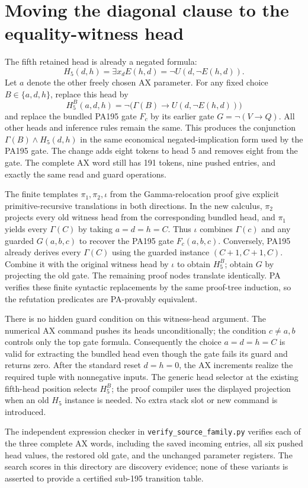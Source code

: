 \section{Moving the diagonal clause to the equality-witness head}
The fifth retained head is already a negated formula:
\[
 H_5(d,h)=\exists x_d E(h,d)=\neg U(d,\neg E(h,d)).
\]
Let $a$ denote the other freely chosen AX parameter.  For any fixed choice
$B\in\{a,d,h\}$, replace this head by
\[
 H_5^B(a,d,h)=\neg\bigl(\Gamma(B)\to U(d,\neg E(h,d))\bigr)
\]
and replace the bundled PA195 gate $F_c$ by its earlier gate $G=\neg(V\to Q)$.
All other heads and inference rules remain the same.  This produces the
conjunction $\Gamma(B)\wedge H_5(d,h)$ in the same economical negated-implication
form used by the PA195 gate.  The change adds eight tokens to head 5 and
removes eight from the gate.  The complete AX word still has 191 tokens,
nine pushed entries, and exactly the same read and guard operations.

The finite templates $\pi_1,\pi_2,\iota$ from the Gamma-relocation proof
give explicit primitive-recursive translations in both directions.
In the new calculus, $\pi_2$ projects every old witness head from the
corresponding bundled head, and $\pi_1$ yields every $\Gamma(C)$ by taking
$a=d=h=C$.  Thus $\iota$ combines $\Gamma(c)$ and any guarded $G(a,b,c)$
to recover the PA195 gate $F_c(a,b,c)$.
Conversely, PA195 already derives every $\Gamma(C)$ using the guarded
instance $(C+1,C+1,C)$.  Combine it with the original witness head by
$\iota$ to obtain $H_5^B$; obtain $G$ by projecting the old gate.  The
remaining proof nodes translate identically.  PA verifies these finite
syntactic replacements by the same proof-tree induction, so the refutation
predicates are PA-provably equivalent.

There is no hidden guard condition on this witness-head argument.  The
numerical AX command pushes its heads unconditionally; the condition
$c\ne a,b$ controls only the top gate formula.  Consequently the choice
$a=d=h=C$ is valid for extracting the bundled head even though the gate
fails its guard and returns zero.  After the standard reset $d=h=0$,
the AX increments realize the required tuple with nonnegative inputs.
The generic head selector at the existing fifth-head position selects
$H_5^B$; the proof compiler uses the displayed projection when an old
$H_5$ instance is needed.  No extra stack slot or new command is introduced.

The independent expression checker in \texttt{verify\_source\_family.py} verifies each
of the three complete AX words, including the saved incoming entries,
all six pushed head values, the restored old gate, and the unchanged
parameter registers.  The search scores in this directory are discovery
evidence; none of these variants is asserted to provide a certified
sub-195 transition table.
